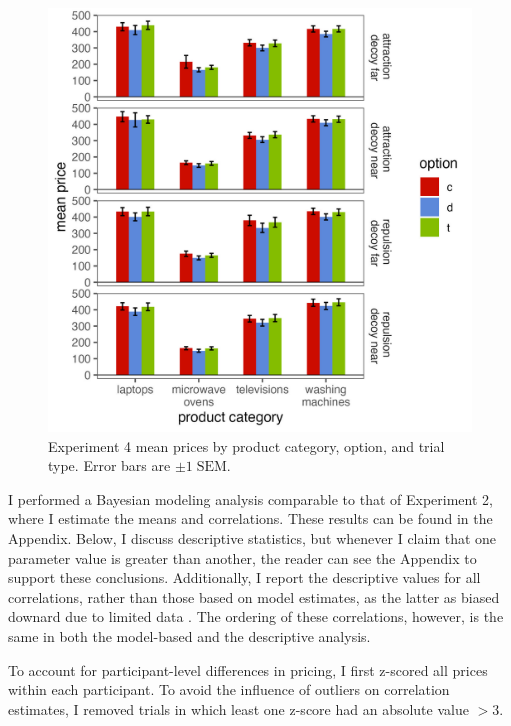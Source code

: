 \begin{figure}
    \includegraphics[width=200mm,scale=0.5]{figures/price_m_by_effect_category.jpeg}
    \caption{Experiment 4 mean prices by product category, option, and trial type. Error bars are $\pm 1\;\text{SEM}$.}
    \label{fig:price_m_by_effect_category}
\end{figure}

I performed a Bayesian modeling analysis comparable to that of Experiment 2, where I estimate the means and correlations. These results can be found in the Appendix. Below, I discuss descriptive statistics, but whenever I claim that one parameter value is greater than another, the reader can see the Appendix to support these conclusions. Additionally, I report the descriptive values for all correlations, rather than those based on model estimates, as the latter as biased downard due to limited data \parencite{stephens2020state,merkle2023opaque}. The ordering of these correlations, however, is the same in both the model-based and the descriptive analysis.

To account for participant-level differences in pricing, I first z-scored all prices within each participant. To avoid the influence of outliers on correlation estimates, I removed trials in which least one z-score had an absolute value $>3$. 

